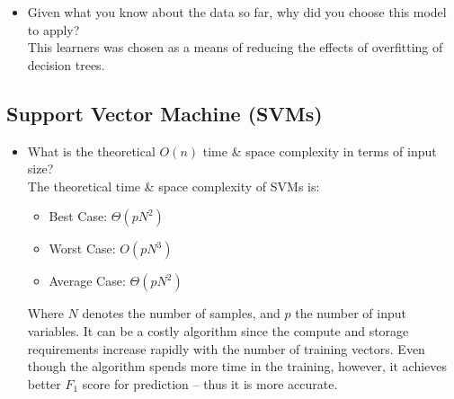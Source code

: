 \documentclass[12pt]{article}
\begin{document}
\begin{itemize}
\item Given what you know about the data so far, why did you choose this model to apply?\\
This learners was chosen as a means of reducing the effects of overfitting of decision trees.
\end{itemize} 




\subsection*{Support Vector Machine (SVMs)}
\begin{itemize}
\item What is the theoretical $O(n)$ time \& space complexity in terms of input size?\\
The theoretical time \& space complexity of SVMs is:
\begin{itemize}[noitemsep,nolistsep]
\item Best Case: $\Theta(pN^2)$ 
\item Worst Case: $O(pN^3)$
\item Average Case: $\Theta(pN^2)$
\end{itemize}
Where $N$ denotes the number of samples, and $p$ the number of input variables. 
It can be a costly algorithm since the compute and storage requirements increase rapidly with the number of training vectors. Even though the algorithm spends more time in the training, however, it achieves better $ F_1$ score for prediction – thus it is more accurate.


\end{itemize}
\end{document}
